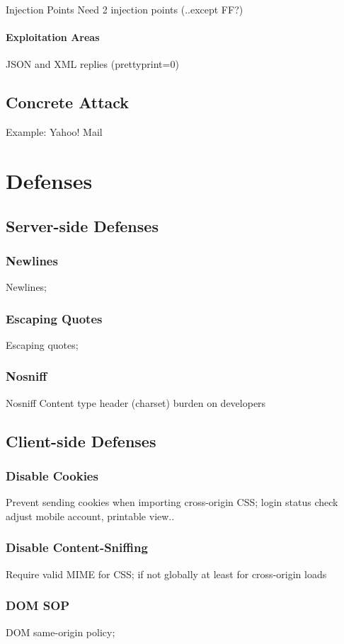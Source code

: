 \documentclass{acm_proc_article-sp}
\begin{document}
Injection Points
Need 2 injection points (..except FF?)

\paragraph{Exploitation Areas}
JSON and XML replies
(prettyprint=0)

\subsection{Concrete Attack}
Example: Yahoo! Mail

\section{Defenses}

\subsection{Server-side Defenses}
\subsubsection{Newlines}
Newlines;
\subsubsection{Escaping Quotes}
Escaping quotes;
\subsubsection{Nosniff}
Nosniff
Content type header (charset)
burden on developers

\subsection{Client-side Defenses}
\subsubsection{Disable Cookies}
Prevent sending cookies when importing cross-origin CSS;
login status check
adjust mobile account, printable view..

\subsubsection{Disable Content-Sniffing}
Require valid MIME for CSS; if not globally at least for cross-origin loads

\subsubsection{DOM SOP}
DOM same-origin policy;
\end{document}
